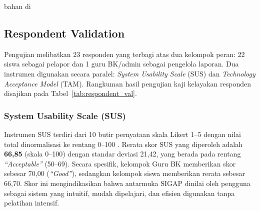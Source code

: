 bahan di\documentclass[conference]{IEEEtran}
\begin{document}
\subsection{Respondent Validation}

Pengujian melibatkan 23 responden yang terbagi atas dua kelompok peran: 22 siswa sebagai pelapor dan 1 guru BK/admin sebagai pengelola laporan. Dua instrumen digunakan secara paralel: \textit{System Usability Scale} (SUS) dan \textit{Technology Acceptance Model} (TAM). Rangkuman hasil pengujian kaji kelayakan responden disajikan pada Tabel~\ref{tab:respondent_val}.

\begin{table}[htbp]
\caption{Hasil Pengujian Validasi Responden (SUS dan TAM)}
\label{tab:respondent_val}
\begin{center}
\end{center}
\end{table}

\subsubsection{System Usability Scale (SUS)}
Instrumen SUS terdiri dari 10 butir pernyataan skala Likert 1--5 dengan nilai total dinormalisasi ke rentang 0--100 \cite{zerovnik2024}. Rerata skor SUS yang diperoleh adalah \textbf{66,85} (skala 0--100) dengan standar deviasi 21,42, yang berada pada rentang \textit{``Acceptable''} (50--69). Secara spesifik, kelompok Guru BK memberikan skor sebesar 70,00 (\textit{``Good''}), sedangkan kelompok siswa memberikan rerata sebesar 66,70. Skor ini mengindikasikan bahwa antarmuka SIGAP dinilai oleh pengguna sebagai sistem yang intuitif, mudah dipelajari, dan efisien digunakan tanpa pelatihan intensif.
\end{document}
